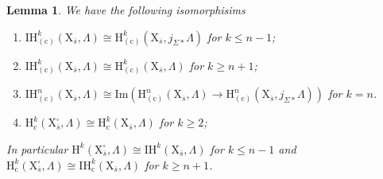 \documentclass[10pt]{amsart}
\numberwithin{equation}{section}
\newtheorem{lemma}[equation]{Lemma}
\theoremstyle{definition}
\def\rmc{\mathrm{c}}
\def\rmH{\mathrm{H}}
\def\rmX{\mathrm{X}}
\begin{document}
\begin{lemma}
We have the following isomorphisims
\begin{enumerate}
\item $\mathrm{IH}^{k}_{(\rmc)}(\rmX_{\overline{s}}, \Lambda)\cong \mathrm{H}^{k}_{(\rmc)}(\rmX_{\overline{s}}, j_{\Sigma\ast}\Lambda)$ for $k\leq n-1$;
\item $\mathrm{IH}^{k}_{(\rmc)}(\rmX_{\overline{s}}, \Lambda)\cong \mathrm{H}^{k}_{(\rmc)}(\rmX_{\overline{s}}, \Lambda)$ for $k\geq n+1$;
\item $\mathrm{IH}^{n}_{(\rmc)}(\rmX_{\overline{s}}, \Lambda)\cong\mathrm{Im}(\rmH^{n}_{(\rmc)}(\rmX_{\overline{s}}, \Lambda)\rightarrow \rmH^{n}_{(\rmc)}(\rmX_{\overline{s}}, j_{\Sigma\ast} \Lambda))$ for $k=n$.
\item $\mathrm{H}^{k}_{\rmc}(\rmX^{\square}_{\overline{s}}, \Lambda)\cong\mathrm{H}^{k}_{\rmc}(\rmX_{\overline{s}}, \Lambda)$ for $k\geq 2$;
\end{enumerate}
In particular $\mathrm{H}^{k}(\rmX^{\square}_{\overline{s}}, \Lambda)\cong\mathrm{IH}^{k}(\rmX_{\overline{s}}, \Lambda)$ for $k\leq n-1$ and $\mathrm{H}^{k}_{\rmc}(\rmX^{\square}_{\overline{s}}, \Lambda)\cong\mathrm{IH}^{k}_{\rmc}(\rmX_{\overline{s}}, \Lambda)$ for $k\geq n+1$.
\end{lemma}
\end{document}
